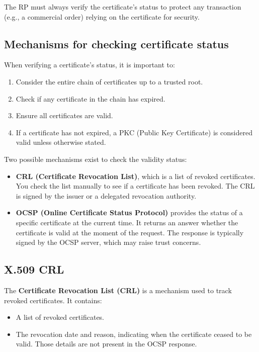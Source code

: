 \begin{boxH}
  The RP must always verify the certificate's status to protect any
  transaction (e.g., a commercial order) relying on the certificate
  for security.
\end{boxH}

\subsection{Mechanisms for checking certificate status}
When verifying a certificate's status, it is important to:
\begin{enumerate}
    \item Consider the entire chain of certificates up to a trusted root.
    \item Check if any certificate in the chain has expired.
    \item Ensure all certificates are valid.
    \item If a certificate has not expired, a PKC (Public Key
      Certificate) is considered valid unless otherwise stated.
\end{enumerate}

Two possible mechanisms exist to check the validity status:
\begin{itemize}
    \item \textbf{CRL (Certificate Revocation List)}, which is a list
      of revoked certificates. You check the list manually to see if a
      certificate has been revoked. The CRL is signed by the issuer or
      a delegated revocation authority.
    \item \textbf{OCSP (Online Certificate Status Protocol)} provides
      the status of a specific certificate at the current time. It
      returns an answer whether the certificate is valid at the moment
      of the request. The response is typically signed by the OCSP
      server, which may raise trust concerns.
\end{itemize}

\subsection{X.509 CRL}
The \textbf{Certificate Revocation List (CRL)} is a mechanism 
used to track revoked certificates. It contains:
\begin{itemize}
    \item A list of revoked certificates.
    \item The revocation date and reason, indicating when the 
    certificate ceased to be valid. Those details are not present 
    in the OCSP response.
\end{itemize}

